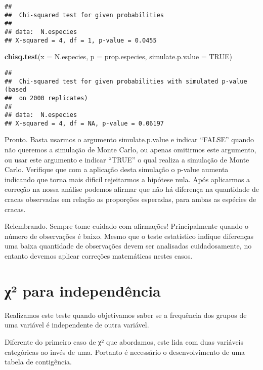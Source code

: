 \documentclass[]{book}
\newenvironment{Shaded}{\begin{snugshade}}{\end{snugshade}}
\newcommand{\DataTypeTok}[1]{\textcolor[rgb]{0.13,0.29,0.53}{#1}}
\newcommand{\KeywordTok}[1]{\textcolor[rgb]{0.13,0.29,0.53}{\textbf{#1}}}
\newcommand{\NormalTok}[1]{#1}
\newcommand{\OtherTok}[1]{\textcolor[rgb]{0.56,0.35,0.01}{#1}}
\begin{document}
\begin{verbatim}
## 
##  Chi-squared test for given probabilities
## 
## data:  N.especies
## X-squared = 4, df = 1, p-value = 0.0455
\end{verbatim}

\begin{Shaded}
\begin{Highlighting}[]
\KeywordTok{chisq.test}\NormalTok{(}\DataTypeTok{x =}\NormalTok{ N.especies, }\DataTypeTok{p =}\NormalTok{ prop.especies, }\DataTypeTok{simulate.p.value =} \OtherTok{TRUE}\NormalTok{)}
\end{Highlighting}
\end{Shaded}

\begin{verbatim}
## 
##  Chi-squared test for given probabilities with simulated p-value (based
##  on 2000 replicates)
## 
## data:  N.especies
## X-squared = 4, df = NA, p-value = 0.06197
\end{verbatim}

Pronto. Basta usarmos o argumento simulate.p.value e indicar ``FALSE'' quando não queremos a simulação de Monte Carlo, ou apenas omitirmos este argumento, ou usar este argumento e indicar ``TRUE'' o qual realiza a simulação de Monte Carlo. Verifique que com a aplicação desta simulação o p-value aumenta indicando que torna mais dificil rejeitarmos a hipótese nula. Após aplicarmos a correção na nossa análise podemos afirmar que não há diferença na quantidade de cracas observadas em relação as proporções esperadas, para ambas as espécies de cracas.

Relembrando. Sempre tome cuidado com afirmações! Principalmente quando o número de observações é baixo. Mesmo que o teste estatístico indique diferenças uma baixa quantidade de observações devem ser analisadas cuidadosamente, no entanto devemos aplicar correções matemáticas nestes casos.

\hypertarget{ux3c7-para-independuxeancia}{%
\section{χ² para independência}\label{ux3c7-para-independuxeancia}}

Realizamos este teste quando objetivamos saber se a frequência dos grupos de uma variável é independente de outra variável.

Diferente do primeiro caso de χ² que abordamos, este lida com duas variáveis categóricas ao invés de uma. Portanto é necessário o desenvolvimento de uma tabela de contigência.
\end{document}
